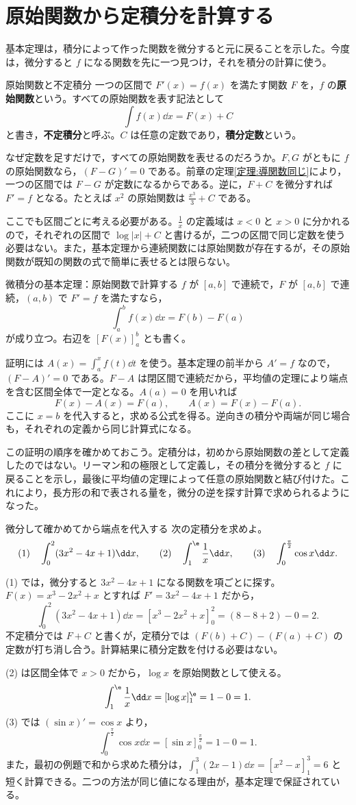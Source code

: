 \section{原始関数から定積分を計算する}\label{節:原始関数基本定理}
基本定理は，積分によって作った関数を微分すると元に戻ることを示した。今度は，微分すると $f$ になる関数を先に一つ見つけ，それを積分の計算に使う。

\begin{definition}{原始関数と不定積分}
一つの区間で $F'(x)=f(x)$ を満たす関数 $F$ を，$f$ の\textbf{原始関数}という。すべての原始関数を表す記法として
\[
 \int f(x)\dd x=F(x)+C
\]
と書き，\textbf{不定積分}と呼ぶ。$C$ は任意の定数であり，\textbf{積分定数}という。
\end{definition}

なぜ定数を足すだけで，すべての原始関数を表せるのだろうか。$F,G$ がともに $f$ の原始関数なら，$(F-G)'=0$ である。前章の定理\ref{定理:導関数同じ}により，一つの区間では $F-G$ が定数になるからである。逆に，$F+C$ を微分すれば $F'=f$ となる。たとえば $x^2$ の原始関数は $\frac{x^3}{3}+C$ である。

ここでも区間ごとに考える必要がある。$\frac1x$ の定義域は $x<0$ と $x>0$ に分かれるので，それぞれの区間で $\log|x|+C$ と書けるが，二つの区間で同じ定数を使う必要はない。また，基本定理から連続関数には原始関数が存在するが，その原始関数が既知の関数の式で簡単に表せるとは限らない。

\begin{theorem}{微積分の基本定理：原始関数で計算する}\label{定理:基本定理第二}
$f$ が $[a,b]$ で連続で，$F$ が $[a,b]$ で連続，$(a,b)$ で $F'=f$ を満たすなら，
\[
 \int_a^b f(x)\dd x=F(b)-F(a)
\]
が成り立つ。右辺を $[F(x)]_a^b$ とも書く。
\end{theorem}

証明には $A(x)=\int_a^x f(t)\dd t$ を使う。基本定理の前半から $A'=f$ なので，$(F-A)'=0$ である。$F-A$ は閉区間で連続だから，平均値の定理により端点を含む区間全体で一定となる。$A(a)=0$ を用いれば
\[
 F(x)-A(x)=F(a),\qquad A(x)=F(x)-F(a).
\]
ここに $x=b$ を代入すると，求める公式を得る。逆向きの積分や両端が同じ場合も，それぞれの定義から同じ計算式になる。

この証明の順序を確かめておこう。定積分は，初めから原始関数の差として定義したのではない。リーマン和の極限として定義し，その積分を微分すると $f$ に戻ることを示し，最後に平均値の定理によって任意の原始関数と結び付けた。これにより，長方形の和で表される量を，微分の逆を探す計算で求められるようになった。

\begin{example}{微分して確かめてから端点を代入する}
次の定積分を求めよ。
\[
 \text{(1)}\quad\int_0^2(3x^2-4x+1)\dd x,\qquad
 \text{(2)}\quad\int_1^{\e}\frac1x\dd x,\qquad
 \text{(3)}\quad\int_0^{\frac\pi2}\cos x\dd x.
\]
\end{example}
(1) では，微分すると $3x^2-4x+1$ になる関数を項ごとに探す。$F(x)=x^3-2x^2+x$ とすれば $F'=3x^2-4x+1$ だから，
\[
 \int_0^2(3x^2-4x+1)\dd x
 =[x^3-2x^2+x]_0^2=(8-8+2)-0=2.
\]
不定積分では $F+C$ と書くが，定積分では $(F(b)+C)-(F(a)+C)$ の定数が打ち消し合う。計算結果に積分定数を付ける必要はない。

(2) は区間全体で $x>0$ だから，$\log x$ を原始関数として使える。
\[
 \int_1^{\e}\frac1x\dd x=[\log x]_1^{\e}=1-0=1.
\]
(3) では $(\sin x)'=\cos x$ より，
\[
 \int_0^{\frac\pi2}\cos x\dd x
 =[\sin x]_0^{\frac\pi2}=1-0=1.
\]
また，最初の例題で和から求めた積分は，$\int_1^3(2x-1)\dd x=[x^2-x]_1^3=6$ と短く計算できる。二つの方法が同じ値になる理由が，基本定理で保証されている。

